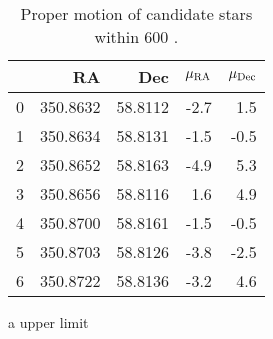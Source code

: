 \begin{table}
\begin{threeparttable}
\begin{tabular}{lrrrr}
\toprule
{} &       RA &     Dec & $\mu_{\rm RA}$ & $\mu_{\rm Dec}$ \\
\midrule
0 & 350.8632 & 58.8112 &           -2.7 &             1.5 \\
1 & 350.8634 & 58.8131 &           -1.5 &            -0.5 \\
2 & 350.8652 & 58.8163 &           -4.9 &             5.3 \\
3 & 350.8656 & 58.8116 &            1.6 &             4.9 \\
4 & 350.8700 & 58.8161 &           -1.5 &            -0.5 \\
5 & 350.8703 & 58.8126 &           -3.8 &            -2.5 \\
6 & 350.8722 & 58.8136 &           -3.2 &             4.6 \\
\bottomrule
\end{tabular}
\begin{tablenotes}
\item[a] upper limit
\end{tablenotes}
\end{threeparttable}
\caption{Proper motion of candidate stars within 600 \kms.}
\label{tab:prop_mot}
\end{table}
